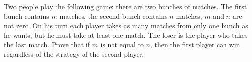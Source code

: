 Two people play the following game: there are two bunches of matches. The first bunch contains $m$ matches, the second bunch contains $n$ matches, $m$ and $n$ are not zero. On his turn each player takes as many matches from only one bunch as he wants, but he must take at least one match. The loser is the player who takes the last match. Prove that if $m$ is not equal to $n$, then the first player can win regardless of the strategy of the second player.
